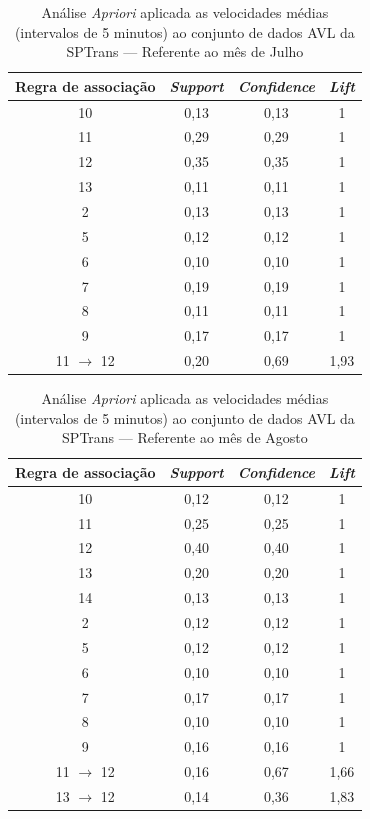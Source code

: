 \documentclass[
	12pt,				%
	oneside,			%
	a4paper,			%
	english,			%
	brazil				%
	]{abntex2ppgsi}
\begin{document}
{{\begin{apendicesenv}
\begin{table}[!htb]
\centering
\caption {Análise \textit{Apriori} aplicada as velocidades médias (intervalos de 5 minutos) ao conjunto de dados AVL da SPTrans --- Referente ao mês de Julho}
\label {tab:aprioriJuly}
\begin{tabular}{c|c|c|c}
\toprule
\textbf{Regra de associação} & \textit{\textbf{Support}} & \textit{\textbf{Confidence}} & \textit{\textbf{Lift}} \\
\midrule
10 &  0,13 &  0,13 &  1\\
\hline
11 &  0,29 &  0,29 &  1\\
\hline
12 &  0,35 &  0,35 &  1\\
\hline
13 &  0,11 &  0,11 &  1\\
\hline
2 &  0,13 &  0,13 &  1\\
\hline
5 &  0,12 &  0,12 &  1\\
\hline
6 &  0,10 &  0,10 &  1\\
\hline
7 &  0,19 &  0,19 &  1\\
\hline
8 &  0,11 &  0,11 &  1\\
\hline
9 &  0,17 &  0,17 &  1\\
\hline
11 $\rightarrow$ 12 &  0,20 &  0,69 &  1,93\\
\bottomrule
\end{tabular}
\end{table}

\begin{table}[!htb]
\centering
\caption {Análise \textit{Apriori} aplicada as velocidades médias (intervalos de 5 minutos) ao conjunto de dados AVL da SPTrans --- Referente ao mês de Agosto}
\label {tab:aprioriAugust}
\begin{tabular}{c|c|c|c}
\toprule
\textbf{Regra de associação} & \textit{\textbf{Support}} & \textit{\textbf{Confidence}} & \textit{\textbf{Lift}} \\
\midrule
10 &  0,12 &  0,12 &  1\\
\hline
11 &  0,25 &  0,25 &  1\\
\hline
12 &  0,40 &  0,40 &  1\\
\hline
13 &  0,20 &  0,20 &  1\\
\hline
14 &  0,13 &  0,13 &  1\\
\hline
2 &  0,12 &  0,12 &  1\\
\hline
5 &  0,12 &  0,12 &  1\\
\hline
6 &  0,10 &  0,10 &  1\\
\hline
7 &  0,17 &  0,17 &  1\\
\hline
8 &  0,10 &  0,10 &  1\\
\hline
9 &  0,16 &  0,16 &  1\\
\hline
11 $\rightarrow$ 12 &  0,16 &  0,67 &  1,66\\
\hline
13 $\rightarrow$ 12 &  0,14 &  0,36 &  1,83\\
\bottomrule
\end{tabular}
\end{table}


\end{apendicesenv}}}
\end{document}
